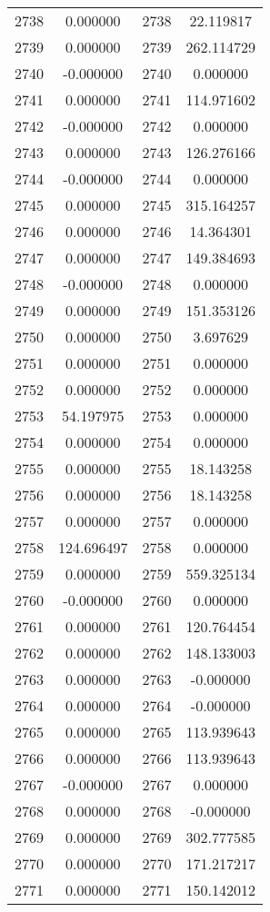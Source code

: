 \documentclass[12pt]{article}
\begin{document}
\begin{longtable}{@{}cccc@{}}
2738 & 0.000000 & 2738 & 22.119817 \\
2739 & 0.000000 & 2739 & 262.114729 \\
2740 & -0.000000 & 2740 & 0.000000 \\
2741 & 0.000000 & 2741 & 114.971602 \\
2742 & -0.000000 & 2742 & 0.000000 \\
2743 & 0.000000 & 2743 & 126.276166 \\
2744 & -0.000000 & 2744 & 0.000000 \\
2745 & 0.000000 & 2745 & 315.164257 \\
2746 & 0.000000 & 2746 & 14.364301 \\
2747 & 0.000000 & 2747 & 149.384693 \\
2748 & -0.000000 & 2748 & 0.000000 \\
2749 & 0.000000 & 2749 & 151.353126 \\
2750 & 0.000000 & 2750 & 3.697629 \\
2751 & 0.000000 & 2751 & 0.000000 \\
2752 & 0.000000 & 2752 & 0.000000 \\
2753 & 54.197975 & 2753 & 0.000000 \\
2754 & 0.000000 & 2754 & 0.000000 \\
2755 & 0.000000 & 2755 & 18.143258 \\
2756 & 0.000000 & 2756 & 18.143258 \\
2757 & 0.000000 & 2757 & 0.000000 \\
2758 & 124.696497 & 2758 & 0.000000 \\
2759 & 0.000000 & 2759 & 559.325134 \\
2760 & -0.000000 & 2760 & 0.000000 \\
2761 & 0.000000 & 2761 & 120.764454 \\
2762 & 0.000000 & 2762 & 148.133003 \\
2763 & 0.000000 & 2763 & -0.000000 \\
2764 & 0.000000 & 2764 & -0.000000 \\
2765 & 0.000000 & 2765 & 113.939643 \\
2766 & 0.000000 & 2766 & 113.939643 \\
2767 & -0.000000 & 2767 & 0.000000 \\
2768 & 0.000000 & 2768 & -0.000000 \\
2769 & 0.000000 & 2769 & 302.777585 \\
2770 & 0.000000 & 2770 & 171.217217 \\
2771 & 0.000000 & 2771 & 150.142012 \\

\end{longtable}
\end{document}
